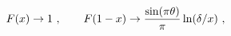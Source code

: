 \begin{equation} \label{asymptotics}
F(x) \rightarrow 1\ ,\qquad
F(1-x) \rightarrow {\sin (\pi\theta)\over \pi} \ln (\delta/x)
\ ,
\end{equation}

